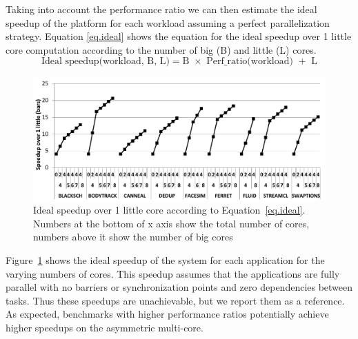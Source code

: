 
Taking into account the performance ratio we can then estimate the ideal speedup of the platform for each workload assuming a perfect parallelization strategy. Equation \ref{eq.ideal} shows the equation for the ideal speedup over 1 little core computation according to the number of big (B) and little (L) cores.
\begingroup\makeatletter\def\f@size{8}\check@mathfonts
\begin{equation}
  \text{Ideal speedup(workload, B, L)} = \text{B $\times$ Perf\_ratio(workload) $+$ L}
\label{eq.ideal}
\end{equation}
\endgroup

\begin{figure}[t]%
	\centering
	\includegraphics[width=1\columnwidth]{figures/ideal_speedup.pdf}
	\vspace{-0.5cm}
	\caption{Ideal speedup over 1 little core according to Equation~\ref{eq.ideal}. Numbers at the bottom of x axis show the total number of cores, numbers above it show the number of big cores}
	\label{fig:ideal}%
\end{figure}

Figure~\ref{fig:ideal} shows the ideal speedup of the system for each application for the varying numbers of cores. This speedup assumes that the applications are fully parallel with no barriers or synchronization points and zero dependencies between tasks. Thus these speedups are unachievable, but we report them as a reference. As expected, benchmarks with higher performance ratios potentially achieve higher speedups on the asymmetric multi-core.
